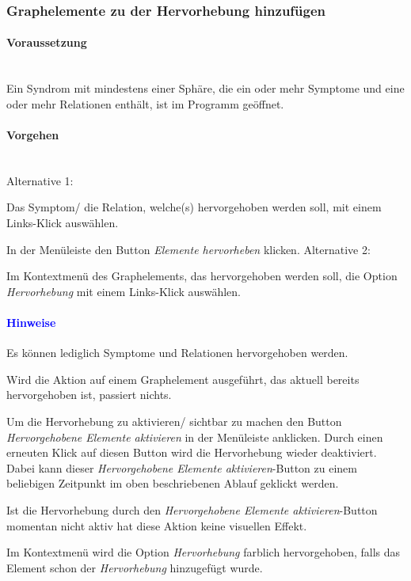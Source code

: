 \documentclass[enabledeprecatedfontcommands,fontsize=11pt,paper=a4,twoside]{scrartcl}
\newcounter{one}
\newcounter{two}[one]
\newcommand*{\hint}{\paragraph{\textcolor{blue}{Hinweise}}}
\newcommand*{\condition}{\paragraph{Voraussetzung}$\;$ \vspace{0.2cm}\\}
\newcommand*{\actions}{\paragraph{Vorgehen} $\;$\vspace{0.2cm}\\}
\newcommand*{\aOne}{\textcolor{bbe}{Alternative 1:}}
\newcommand*{\aTwo}{\textcolor{bbe}{Alternative 2:}}
\let\tempone\itemize
\let\temptwo\enditemize
\renewenvironment{itemize}{\tempone\addtolength{\itemsep}{-10.0pt}}{\temptwo}
\let\origenumerate\enumerate
\let\origendenumerate\endenumerate
\renewenvironment{enumerate}{\origenumerate \addtolength{\itemsep}{-10.0pt}}{\origendenumerate}
\begin{document}
		\subsubsection{Graphelemente zu der Hervorhebung hinzufügen}
		\condition 	
		Ein Syndrom mit mindestens einer Sphäre, die ein oder mehr Symptome und eine oder mehr Relationen enthält, ist im Programm geöffnet. 
		\actions
		\aOne
		\begin{enumerate}
			\item Das Symptom/ die Relation, welche(s) hervorgehoben werden soll, mit einem Links-Klick auswählen. 
			\item In der Menüleiste den Button \textit{Elemente hervorheben} klicken.
		\end{enumerate}
		\aTwo
		\begin{enumerate}
			\item Im Kontextmenü des Graphelements, das hervorgehoben werden soll, die Option \textit{Hervorhebung} mit einem Links-Klick auswählen.
		\end{enumerate}
		\hint
		\begin{itemize}
					\item Es können lediglich Symptome und Relationen hervorgehoben werden.
					\item Wird die Aktion auf einem Graphelement ausgeführt, das aktuell bereits hervorgehoben ist, passiert nichts.
					\item Um die Hervorhebung zu aktivieren/ sichtbar zu machen den Button \textit{Hervorgehobene Elemente aktivieren} in der Menüleiste anklicken. Durch einen erneuten Klick auf diesen Button wird die Hervorhebung wieder deaktiviert. Dabei kann dieser \textit{Hervorgehobene Elemente aktivieren}-Button zu einem beliebigen Zeitpunkt im oben beschriebenen Ablauf geklickt werden.
					\item Ist die Hervorhebung durch den \textit{Hervorgehobene Elemente aktivieren}-Button momentan nicht aktiv hat diese Aktion keine visuellen Effekt. 
					\item Im Kontextmenü wird die Option \textit{Hervorhebung} farblich hervorgehoben, falls das Element schon der \textit{Hervorhebung} hinzugefügt wurde. \\
		\end{itemize}
			
\end{document}
